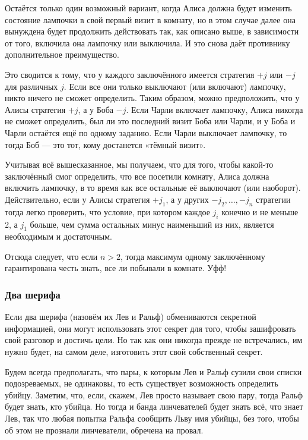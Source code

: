 Остаётся только один возможный вариант, когда Алиса должна будет изменить состояние лампочки в свой первый визит в комнату, но в этом случае далее она вынуждена будет продолжить действовать так, как описано выше, в зависимости от того, включила она лампочку или выключила.
И это снова даёт противнику дополнительное преимущество.

Это сводится к тому, что у каждого заключённого имеется стратегия $+j$ или $-j$ для различных $j$.
Если все они только выключают (или включают) лампочку, никто ничего не сможет определить.
Таким образом, можно предположить, что у Алисы стратегия $+j$, а у Боба $-j$.
Если Чарли включает лампочку, Алиса никогда не сможет определить, был ли это последний визит Боба или Чарли, и у Боба и Чарли остаётся ещё по одному заданию.
Если Чарли выключает лампочку, то тогда Боб --- это тот, кому достанется «тёмный визит».

Учитывая всё вышесказанное, мы получаем, что для того, чтобы какой-то заключённый смог определить, что все посетили комнату, Алиса должна включить лампочку, в то время как все остальные её выключают (или наоборот).
Действительно, если у Алисы стратегия $+j_1$, а у других  $-j_2,\dots,-j_n$ стратегии тогда легко проверить, что условие, при котором каждое $j_i$ конечно и не меньше 2, а $j_1$ больше, чем сумма остальных минус наименьший из них, является необходимым и достаточным.

Отсюда следует, что если $n>2$, тогда максимум одному заключённому гарантирована честь знать, все ли побывали в комнате.
Уфф!

\subsubsection*{Два шерифа}%

Если два шерифа (назовём их Лев и Ральф) обмениваются секретной информацией, они могут использовать этот секрет для того, чтобы зашифровать свой разговор и достичь цели.
Но так как они никогда прежде не встречались, им нужно будет, на самом деле, изготовить этот свой собственный секрет.

\medskip

Будем всегда предполагать, что пары, к которым Лев и Ральф сузили свои списки подозреваемых, не одинаковы, то есть существует возможность определить убийцу.
Заметим, что, если, скажем, Лев просто называет свою пару, тогда Ральф будет знать, кто убийца.
Но тогда и банда линчевателей будет знать всё, что знает Лев, так что любая попытка Ральфа сообщить Льву имя убийцы, без того, чтобы об этом не прознали линчеватели, обречена на провал.


